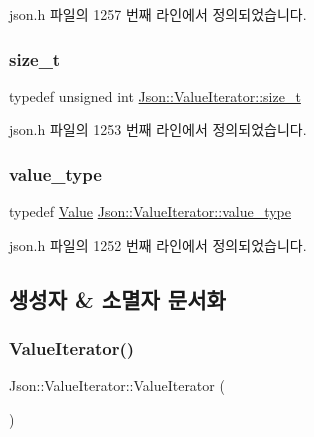 json.\+h 파일의 1257 번째 라인에서 정의되었습니다.

\mbox{\label{class_json_1_1_value_iterator_a308b8932ffc83eaa9d12dadd5c11a7dd}} 
\subsubsection{\texorpdfstring{size\+\_\+t}{size\_t}}
{\footnotesize\ttfamily typedef unsigned int \hyperlink{class_json_1_1_value_iterator_a308b8932ffc83eaa9d12dadd5c11a7dd}{Json\+::\+Value\+Iterator\+::size\+\_\+t}}



json.\+h 파일의 1253 번째 라인에서 정의되었습니다.

\mbox{\label{class_json_1_1_value_iterator_a2c5ba7be611f05546530c8a88b2d2e37}} 
\subsubsection{\texorpdfstring{value\+\_\+type}{value\_type}}
{\footnotesize\ttfamily typedef \hyperlink{class_json_1_1_value}{Value} \hyperlink{class_json_1_1_value_iterator_a2c5ba7be611f05546530c8a88b2d2e37}{Json\+::\+Value\+Iterator\+::value\+\_\+type}}



json.\+h 파일의 1252 번째 라인에서 정의되었습니다.



\subsection{생성자 \& 소멸자 문서화}
\mbox{\label{class_json_1_1_value_iterator_a09425cf4dc12244072a942f290a5c0ec}} 
\subsubsection{\texorpdfstring{Value\+Iterator()}{ValueIterator()}\hspace{0.1cm}{\footnotesize\ttfamily [1/4]}}
{\footnotesize\ttfamily Json\+::\+Value\+Iterator\+::\+Value\+Iterator (\begin{DoxyParamCaption}{ }\end{DoxyParamCaption})}



